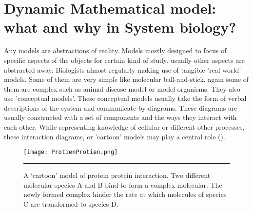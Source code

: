 \section{Dynamic Mathematical model: what and why in System biology?}
Any models are abstractions of reality. Models mostly designed to focus of specific aspects of the objects for certain kind of study. usually other aspects are abstracted away. Biologists almost regularly making use of tangible 'real world' models. Some of them are very simple like molecular ball-and-stick, again some of them are complex such as animal disease model or model organisms. They also use 'conceptual models'. These conceptual models usually take the form of verbal descriptions of the system and communicate by diagrams. These diagrams are usually constructed with a set of components and the ways they interact with each other. While representing knowledge of cellular or different other processes, these interaction diagrams, or 'cartoon' models may play a central role (\cite{Ingalls:2012}).

\begin{figure}%
	\centering
		\texttt{[image: ProtienProtien.png]}
		\rule{35em}{0.5pt}
	\caption[A ‘cartoon’ model of protein protein interaction.]{A ‘cartoon’ model of protein protein interaction. Two different molecular species A and B bind to form a complex molecular. The newly formed complex hinder the rate at which molecules of species C are transformed to species D.}
	\label{fig:Protein protein interaction}
\end{figure}

